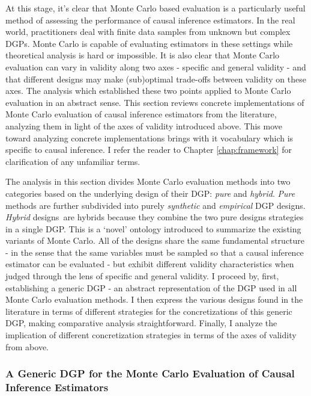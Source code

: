 \documentclass[../main.tex]{subfiles}
\begin{document}
\vspace{\baselineskip}
At this stage, it’s clear that Monte Carlo based evaluation is a particularly useful method of assessing the performance of causal inference estimators. In the real world, practitioners deal with finite data samples from unknown but complex DGPs. Monte Carlo is capable of evaluating estimators in these settings while theoretical analysis is hard or impossible. It is also clear that Monte Carlo evaluation can vary in validity along two axes - specific and general validity - and that different designs may make (sub)optimal trade-offs between validity on these axes. The analysis which established these two points applied to Monte Carlo evaluation in an abstract sense. This section reviews concrete implementations of Monte Carlo evaluation of causal inference estimators from the literature, analyzing them in light of the axes of validity introduced above. This move toward analyzing concrete implementations brings with it vocabulary which is specific to causal inference. I refer the reader to Chapter \ref{chap:framework} for clarification of any unfamiliar terms.\par


\vspace{\baselineskip}
The analysis in this section divides Monte Carlo evaluation methods into two categories based on the underlying design of their DGP: \textit{pure} and \textit{hybrid}. \textit{Pure} methods are further subdivided into purely \textit{synthetic }and \textit{empirical }DGP designs. \textit{Hybrid }designs\ are hybrids because they combine the two pure designs strategies in a single DGP. This is a ‘novel’ ontology introduced to summarize the existing variants of Monte Carlo. All of the designs share the same fundamental structure  - in the sense that the same variables must be sampled so that a causal inference estimator can be evaluated - but exhibit different validity characteristics when judged through the lens of specific and general validity. I proceed by, first, establishing a generic DGP - an abstract representation of the DGP used in all Monte Carlo evaluation methods. I then express the various designs found in the literature in terms of different strategies for the concretizations of this generic DGP, making comparative analysis straightforward. Finally, I analyze the implication of different concretization strategies in terms of the axes of validity from above.\par

\subsubsection{A Generic DGP for the Monte Carlo Evaluation of Causal Inference Estimators}
\end{document}
